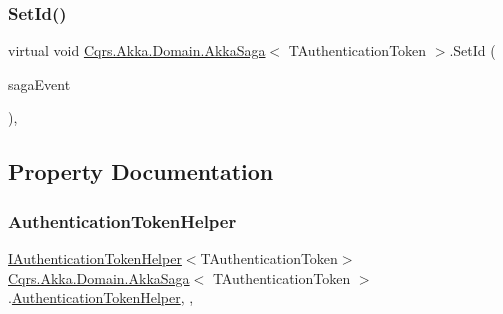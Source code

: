 \subsubsection{\texorpdfstring{Set\+Id()}{SetId()}}
{\footnotesize\ttfamily virtual void \hyperlink{classCqrs_1_1Akka_1_1Domain_1_1AkkaSaga}{Cqrs.\+Akka.\+Domain.\+Akka\+Saga}$<$ T\+Authentication\+Token $>$.Set\+Id (\begin{DoxyParamCaption}\item[{\hyperlink{interfaceCqrs_1_1Events_1_1ISagaEvent}{I\+Saga\+Event}$<$ T\+Authentication\+Token $>$}]{saga\+Event }\end{DoxyParamCaption})\hspace{0.3cm}{\ttfamily [protected]}, {\ttfamily [virtual]}}



\subsection{Property Documentation}
\mbox{\label{classCqrs_1_1Akka_1_1Domain_1_1AkkaSaga_a18e4d7faa9cd9d10ac2ac0bd3b6c9fc9}} 
\subsubsection{\texorpdfstring{Authentication\+Token\+Helper}{AuthenticationTokenHelper}}
{\footnotesize\ttfamily \hyperlink{interfaceCqrs_1_1Authentication_1_1IAuthenticationTokenHelper}{I\+Authentication\+Token\+Helper}$<$T\+Authentication\+Token$>$ \hyperlink{classCqrs_1_1Akka_1_1Domain_1_1AkkaSaga}{Cqrs.\+Akka.\+Domain.\+Akka\+Saga}$<$ T\+Authentication\+Token $>$.\hyperlink{classCqrs_1_1Authentication_1_1AuthenticationTokenHelper}{Authentication\+Token\+Helper}\hspace{0.3cm}{\ttfamily [get]}, {\ttfamily [set]}, {\ttfamily [protected]}}

\mbox{\label{classCqrs_1_1Akka_1_1Domain_1_1AkkaSaga_ac00968d1d69d89d46b43af10fc0d4510}} 
